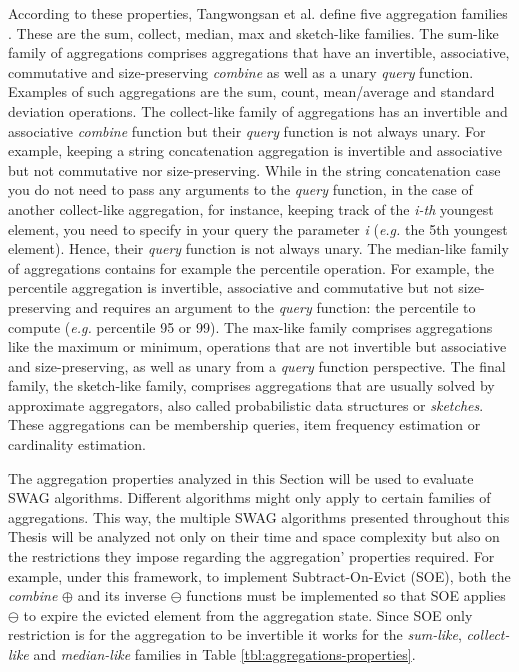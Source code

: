 According to these properties, Tangwongsan et al. define five aggregation families \cite{Tangwongsan-Sliding-Window-Aggregation-Algorithms}. These are the sum, collect, median, max and sketch-like families. The sum-like family of aggregations comprises aggregations that have an invertible, associative, commutative and size-preserving \textit{combine} as well as a unary \textit{query} function. Examples of such aggregations are the sum, count, mean/average and standard deviation operations. The collect-like family of aggregations has an invertible and associative \textit{combine} function but their \textit{query} function is not always unary. For example, keeping a string concatenation aggregation is invertible and associative but not commutative nor size-preserving. While in the string concatenation case you do not need to pass any arguments to the \textit{query} function, in the case of another collect-like aggregation, for instance, keeping track of the \textit{i-th} youngest element, you need to specify in your query the parameter \textit{i} (\textit{e.g.} the 5th youngest element). Hence, their \textit{query} function is not always unary. The median-like family of aggregations contains for example the percentile operation. For example, the percentile aggregation is invertible, associative and commutative but not size-preserving and requires an argument to the \textit{query} function: the percentile to compute (\textit{e.g.} percentile 95 or 99). The max-like family comprises aggregations like the maximum or minimum, operations that are not invertible but associative and size-preserving, as well as unary from a \textit{query} function perspective. The final family, the sketch-like family, comprises aggregations that are usually solved by approximate aggregators, also called probabilistic data structures or \textit{sketches}. These aggregations can be membership queries, item frequency estimation or cardinality estimation.

The aggregation properties analyzed in this Section will be used to evaluate SWAG algorithms. Different algorithms might only apply to certain families of aggregations. This way, the multiple SWAG algorithms presented throughout this Thesis will be analyzed not only on their time and space complexity but also on the restrictions they impose regarding the aggregation' properties required. For example, under this framework, to implement Subtract-On-Evict (SOE), both the \textit{combine} $\oplus$ and its inverse $\ominus$ functions must be implemented so that SOE applies $\ominus$ to expire the evicted element from the aggregation state. Since SOE only restriction is for the aggregation to be invertible it works for the \textit{sum-like}, \textit{collect-like} and \textit{median-like} families in Table \ref{tbl:aggregations-properties}.

